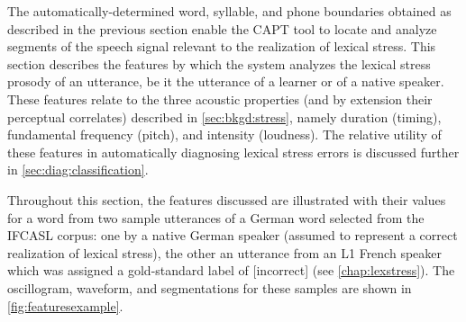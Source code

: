 	The automatically-determined word, syllable, and phone boundaries obtained as described in the previous section 
	enable the CAPT tool to locate and analyze segments of the speech signal relevant to the realization of lexical stress.
	This section describes the features by which the system analyzes the lexical stress prosody of an utterance, be it the utterance of a learner or of a native speaker. These features relate to the three acoustic properties (and by extension their perceptual correlates) described in \cref{sec:bkgd:stress}, namely duration (timing), fundamental frequency (pitch), and intensity (loudness). 
	The relative utility of these features in automatically diagnosing lexical stress errors is discussed further in \cref{sec:diag:classification}.
%
%	



	Throughout this section, the features discussed are illustrated with their values for a word from two sample utterances of a German word selected from the IFCASL corpus:
	one by a native German speaker (assumed to represent a correct realization of lexical stress), the other an utterance from an L1 French speaker which was assigned a gold-standard label of [incorrect] (see \cref{chap:lexstress}).
 The oscillogram, waveform, and segmentations for these samples are shown in \cref{fig:featuresexample}.
	
